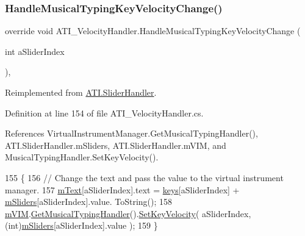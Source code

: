 \subsubsection{\texorpdfstring{Handle\+Musical\+Typing\+Key\+Velocity\+Change()}{HandleMusicalTypingKeyVelocityChange()}}
{\footnotesize\ttfamily override void A\+T\+I\+\_\+\+Velocity\+Handler.\+Handle\+Musical\+Typing\+Key\+Velocity\+Change (\begin{DoxyParamCaption}\item[{int}]{a\+Slider\+Index }\end{DoxyParamCaption})\hspace{0.3cm}{\ttfamily [protected]}, {\ttfamily [virtual]}}



Reimplemented from \hyperlink{class_a_t_i_1_1_slider_handler_ac82219a0a69f17025d9484f9e45cca80}{A\+T\+I.\+Slider\+Handler}.



Definition at line 154 of file A\+T\+I\+\_\+\+Velocity\+Handler.\+cs.



References Virtual\+Instrument\+Manager.\+Get\+Musical\+Typing\+Handler(), A\+T\+I.\+Slider\+Handler.\+m\+Sliders, A\+T\+I.\+Slider\+Handler.\+m\+V\+IM, and Musical\+Typing\+Handler.\+Set\+Key\+Velocity().


\begin{DoxyCode}
155     \{
156         \textcolor{comment}{// Change the text and pass the value to the virtual instrument manager.}
157         \hyperlink{class_a_t_i___velocity_handler_ad8c048670a748ece6b2f8bbf287e7674}{mText}[aSliderIndex].text = \hyperlink{class_a_t_i___velocity_handler_a95a1abb133981ac42dce424f0f94d562}{keys}[aSliderIndex] + \hyperlink{class_a_t_i_1_1_slider_handler_a038a487fbd701cb786e77c210830be76}{mSliders}[aSliderIndex].value.
      ToString();
158         \hyperlink{class_a_t_i_1_1_slider_handler_a5d19b4fb92b71c25a667defdda60213f}{mVIM}.\hyperlink{group___v_i_m_pub_func_gae6701458a23a3f14db90501f871d4d0d}{GetMusicalTypingHandler}().\hyperlink{group___mus_typ_pub_func_ga02f86b46bb63dc751b669035b7aa5ce0}{SetKeyVelocity}( 
      aSliderIndex, (\textcolor{keywordtype}{int})\hyperlink{class_a_t_i_1_1_slider_handler_a038a487fbd701cb786e77c210830be76}{mSliders}[aSliderIndex].value );
159     \}
\end{DoxyCode}
\mbox{\label{class_a_t_i___velocity_handler_a1091248299687641294f363aa32de0f0}} 
